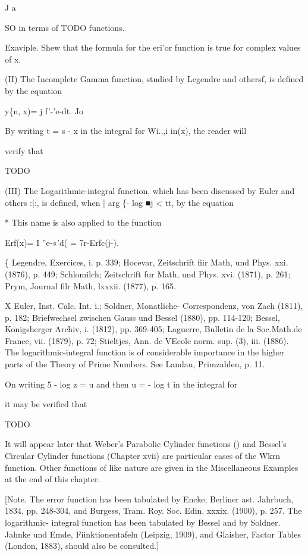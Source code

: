 J a

SO in terms of TODO functions.

Exaviple. Shew that the formula for the eri'or function is true for
complex values of x.

(II) The Incomplete Gamma function, studied by Legendre and othersf,
is defined by the equation

y\{n, x)= j f'-'e-dt. Jo

By writing t = s - x in the integral for Wi.,,i in(x), the reader
will

verify that

TODO

(III) The Logarithmic-integral function, which has been discussed by
Euler and others :|:, is defined, when | arg \{- log ■j < tt, by the
equation

* This name is also applied to the function

Erf(x)= I ''e-«'d( = 7r-Erfc(j-).

\{ Legendre, Exercices, i. p. 339; Hocevar, Zeitschrift fiir Math,
und Phys. xxi. (1876), p. 449; Schlomilch; Zeitschrift fur Math, und
Phys. xvi. (1871), p. 261; Prym, Journal filr Math, lxxxii. (1877),
p. 165.

X Euler, Inst. Calc. Int. i.; Soldner, Monatliche- Correspondenz, von
Zach (1811), p. 182; Briefwechsel zwischen Gauss und Bessel (1880),
pp. 114-120; Bessel, Konigsherger Archiv, i. (1812), pp. 369-405;
Laguerre, Bulletin de la Soc.Math.de France, vii. (1879), p. 72;
Stieltjes, Ann. de VEcole norm. sup. (3), iii. (1886). The
logarithmic-integral function is of considerable importance in the
higher parts of the Theory of Prime Numbers. See Landau, Primzahlen,
p. 11.

%
%

On writing 5 - log z = u and then u = - log t in the integral for

it may be verified that

TODO

It will appear later that Weber's Parabolic Cylinder functions
()
and Bessel's Circular Cylinder functions (Chapter xvii) are
particular cases of the Wkrn function. Other functions of like
nature are given in the Miscellaneous Examples at the end of this
chapter.

[Note. The error function has been tabulated by Encke, Berliner ast.
Jahrbuch, 1834, pp. 248-304, and Burgess, Tram. Roy. Soc. Edin. xxxix.
(1900), p. 257. The logarithmic- integral function has been tabulated
by Bessel and by Soldner. Jahnke und Emde, Fiinktionentafeln (Leipzig,
1909), and Glaisher, Factor Tables (London, 1883), should also be
consulted.]

